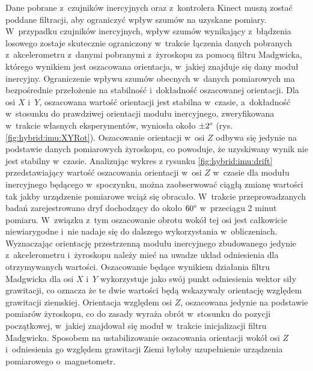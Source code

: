 Dane pobrane z~czujników inercyjnych oraz z~kontrolera Kinect muszą zostać poddane filtracji, aby ograniczyć wpływ szumów na uzyskane pomiary. W~przypadku czujników inercyjnych, wpływ szumów wynikający z~błądzenia losowego zostaje skutecznie ograniczony w~trakcie łączenia danych pobranych z~akcelerometru z~danymi pobranymi z~żyroskopu za pomocą filtru Madgwicka, którego wynikiem jest oszacowana orientacja, w~jakiej znajduje się dany moduł inercyjny. Ograniczenie wpływu szumów obecnych w~danych pomiarowych ma bezpośrednie przełożenie na stabilność i~dokładność oszacowanej orientacji. Dla osi $X$ i~$Y$, oszacowana wartość orientacji jest stabilna w~czasie, a~dokładność w~stosunku do prawdziwej orientacji modułu inercyjnego, zweryfikowana w~trakcie własnych eksperymentów, wyniosła około $\pm 2\degree$ (rys. \ref{fig:hybrid:imu:XYRot}).
Oszacowanie orientacji w~osi $Z$ odbywa się jedynie na podstawie danych pomiarowych żyroskopu, co powoduje, że uzyskiwany wynik nie jest stabilny w~czasie. Analizując wykres z rysunku \ref{fig:hybrid:imu:drift} przedstawiający wartość oszacowania orientacji w~osi $Z$ w~czasie dla modułu inercyjnego będącego w~spoczynku, można zaobserwować ciągłą zmianę wartości tak jakby urządzenie pomiarowe wciąż się obracało. W~trakcie przeprowadzanych badań zarejestrowano dryf dochodzący do około $60\degree$ w~przeciągu 2 minut pomiaru. W~związku z~tym oszacowanie obrotu wokół tej osi jest całkowicie niewiarygodne i~nie nadaje się do dalszego wykorzystania w~obliczeniach. \\
Wyznaczając orientację przestrzenną modułu inercyjnego zbudowanego jedynie z~akcelerometru i~żyroskopu należy mieć na uwadze układ odniesienia dla otrzymywanych wartości. Oszacowanie będące wynikiem działania filtru Madgwicka dla osi $X$ i~$Y$ wykorzystuje jako swój punkt odniesienia wektor siły grawitacji, co oznacza że te dwie wartości będą wskazywały orientację względem grawitacji ziemskiej. Orientacja względem osi $Z$, oszacowana jedynie na podstawie pomiarów żyroskopu, co do zasady wyraża obrót w~stosunku do pozycji początkowej, w~jakiej znajdował się moduł w~trakcie inicjalizacji filtru Madgwicka. Sposobem na ustabilizowanie oszacowania orientacji wokół osi $Z$ i~odniesienia go względem grawitacji Ziemi byłoby uzupełnienie urządzenia pomiarowego o~magnetometr. \\
		
